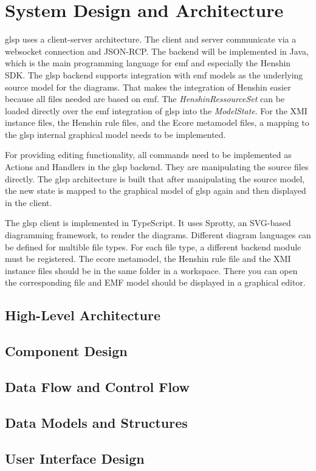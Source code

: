   \section{System Design and Architecture}
  \label{sec:system-design}

    \ac{glsp} uses a client-server architecture. The client and server communicate via a websocket connection and JSON-RCP. The backend will be implemented in Java, which is the main programming language for \ac{emf} and especially the Henshin SDK. The \ac{glsp} backend supports integration with \ac{emf} models as the underlying source model for the diagrams. That makes the integration of Henshin easier because all files needed are based on \ac{emf}. The \textit{HenshinRessourceSet} can be loaded directly over the \ac{emf} integration of \ac{glsp} into the \textit{ModelState}. For the XMI instance files, the Henshin rule files, and the Ecore metamodel files, a mapping to the \ac{glsp} internal graphical model needs to be implemented. \cite{eclipseGLSP}

  For providing editing functionality, all commands need to be implemented as Actions and Handlers in the \ac{glsp} backend. They are manipulating the source files directly. The \ac{glsp} architecture is built that after manipulating the source model, the new state is mapped to the graphical model of \ac{glsp} again and then displayed in the client. \cite{eclipseGLSP} 

  The \ac{glsp} client is implemented in TypeScript. It uses Sprotty, an SVG-based diagramming framework, to render the diagrams.
  Different diagram languages can be defined for multible file types. For each file type, a different backend module must be registered. The ecore metamodel, the Henshin rule file and the XMI instance files should be in the same folder in a workspace. There you can open the corresponding file and EMF model should be displayed in a graphical editor.

  \subsection{High-Level Architecture}
  \label{subsec:high-level-architecture}

  \subsection{Component Design}
  \label{subsec:component-design}

  \subsection{Data Flow and Control Flow}
  \label{subsec:data-flow}

  \subsection{Data Models and Structures}
  \label{subsec:data-models}

  \subsection{User Interface Design}
  \label{subsec:user-interface-design}